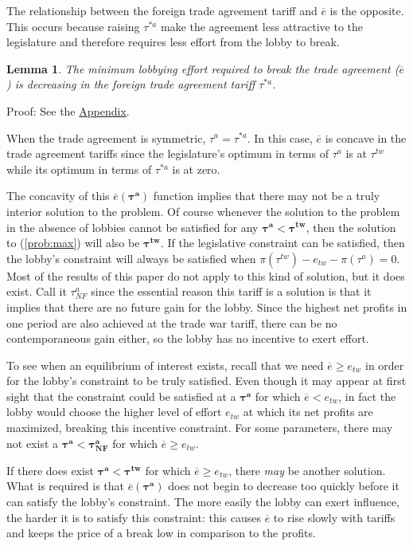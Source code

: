 \documentclass[authoryear, review]{elsarticle}
\newtheorem{lemma}{Lemma}
\newcommand{\ov}{\overline}
\newcommand{\bta}{\bm{\tau^a}}
\newcommand{\btw}{\bm{\tau^{tw}}}
\begin{document}
The relationship between the foreign trade agreement tariff and $\ov{e}$ is the opposite. This occurs because raising $\tau^{*a}$ make the agreement less attractive to the legislature and therefore requires less effort from the lobby to break.
\begin{lemma}
  The minimum lobbying effort required to break the trade agreement ($\ov{e}$) is decreasing in the foreign trade agreement tariff $\tau^{*a}$.
  \label{lem:ets}
\end{lemma}
Proof: See the \hyperlink{Lem_ets}{Appendix}.

When the trade agreement is symmetric, $\tau^a = \tau^{*a}$. In this case, $\ov{e}$ is concave in the trade agreement tariffs since the legislature's optimum in terms of $\tau^a$ is at $\tau^{tw}$ while its optimum in terms of $\tau^{*a}$ is at zero.

The concavity of this $\ov{e}(\bta)$ function implies that there may not be a truly interior solution to the problem. Of course whenever the solution to the problem in the absence of lobbies cannot be satisfied for any $\bta < \btw$, then the solution to (\ref{prob:max}) will also be $\btw$. If the legislative constraint can be satisfied, then the lobby's constraint will always be satisfied when $\pi(\tau^{tw}) -e_{tw} - \pi(\tau^a) =0$. Most of the results of this paper do not apply to this kind of solution, but it does exist. Call it $\tau^a_{NF}$ since the essential reason this tariff is a solution is that it implies that there are no future gain for the lobby. Since the highest net profits in one period are also achieved at the trade war tariff, there can be no contemporaneous gain either, so the lobby has no incentive to exert effort.

To see when an equilibrium of interest exists, recall that we need $\ov{e} \geq e_{tw}$ in order for the lobby's constraint to be truly satisfied. Even though it may appear at first sight that the constraint could be satisfied at a $\bta$ for which $\ov{e} < e_{tw}$, in fact the lobby would choose the higher level of effort $e_{tw}$ at which its net profits are maximized, breaking this incentive constraint. For some parameters, there may not exist a $\bta < \bm{\tau^a_{NF}}$ for which $\ov{e} \geq e_{tw}$.

If there does exist $\bta < \btw$ for which $\ov{e} \geq e_{tw}$, there \textit{may} be another solution. What is required is that $\ov{e}(\bta)$ does not begin to decrease too quickly before it can satisfy the lobby's constraint. The more easily the lobby can exert influence, the harder it is to satisfy this constraint: this causes $\ov{e}$ to rise slowly with tariffs and keeps the price of a break low in comparison to the profits.
\end{document}
